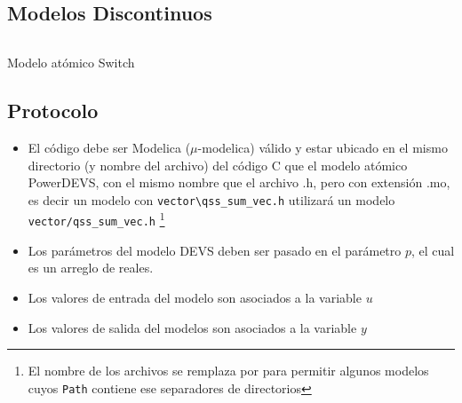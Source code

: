 \documentclass{beamer}
\begin{document}
\subsection{Modelos Discontinuos}
\begin{frame}[fragile]
\begin{listing}[H]
        \inputminted[]{modelica}{../../data/qss/qss_switch.mo}
        \caption{Modelo atómico Switch}\label{lst:qss_switch.mo}
\end{listing}
\end{frame}

\subsection{Protocolo}
\begin{frame}[fragile]
\begin{itemize}
        \item El código debe ser Modelica ($\mu$-modelica) válido y estar ubicado en el mismo directorio (y nombre del archivo) del código C que el modelo atómico 
        PowerDEVS, con el mismo nombre que el archivo .h, pero con extensión .mo, es decir un modelo con \texttt{vector\textbackslash qss\_sum\_vec.h} 
	utilizará un modelo \texttt{vector/qss\_sum\_vec.h} \footnote{El nombre de los archivos se remplaza \quotes{\textbackslash} por \quotes{/} para permitir 
	algunos modelos cuyos \texttt{Path} contiene ese separadores de directorios}
        \item Los parámetros del modelo DEVS deben ser pasado en el parámetro $p$, el cual es un arreglo de reales. 
        \item Los valores de entrada del modelo son asociados a la variable $u$
        \item Los valores de salida del modelos son asociados a la variable $y$
\end{itemize}
\end{frame}

\end{document}

